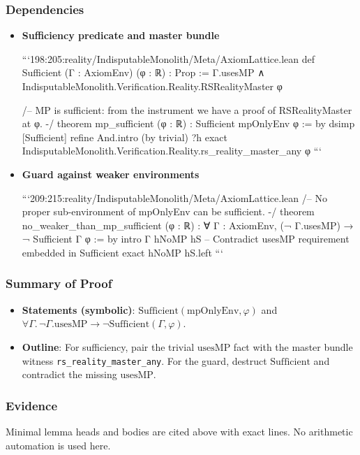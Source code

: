 \documentclass{article}
\begin{document}
\subsubsection{Dependencies}
\begin{itemize}[leftmargin=*]
  \item \textbf{Sufficiency predicate and master bundle}

```198:205:reality/IndisputableMonolith/Meta/AxiomLattice.lean
def Sufficient (Γ : AxiomEnv) (φ : ℝ) : Prop :=
  Γ.usesMP ∧ IndisputableMonolith.Verification.Reality.RSRealityMaster φ

/-- MP is sufficient: from the instrument we have a proof of RSRealityMaster at φ. -/
 theorem mp_sufficient (φ : ℝ) : Sufficient mpOnlyEnv φ := by
  dsimp [Sufficient]
  refine And.intro (by trivial) ?h
  exact IndisputableMonolith.Verification.Reality.rs_reality_master_any φ
```

  \item \textbf{Guard against weaker environments}

```209:215:reality/IndisputableMonolith/Meta/AxiomLattice.lean
/-- No proper sub-environment of mpOnlyEnv can be sufficient. -/
 theorem no_weaker_than_mp_sufficient (φ : ℝ) :
  ∀ Γ : AxiomEnv, (¬ Γ.usesMP) → ¬ Sufficient Γ φ := by
  intro Γ hNoMP hS
  -- Contradict usesMP requirement embedded in Sufficient
  exact hNoMP hS.left
```
\end{itemize}

\subsubsection{Summary of Proof}
\begin{itemize}[leftmargin=*]
  \item \textbf{Statements (symbolic)}:
    \(\mathrm{Sufficient}(\mathrm{mpOnlyEnv},φ)\) and \(\forall Γ.\, \neg Γ.\mathrm{usesMP} \to \neg \mathrm{Sufficient}(Γ,φ)\).
  \item \textbf{Outline}: For sufficiency, pair the trivial \(\mathrm{usesMP}\) fact with the master bundle witness \texttt{rs\_reality\_master\_any}. For the guard, destruct \(\mathrm{Sufficient}\) and contradict the missing \(\mathrm{usesMP}\).
\end{itemize}

\subsubsection{Evidence}
Minimal lemma heads and bodies are cited above with exact lines. No arithmetic automation is used here.
\end{document}
